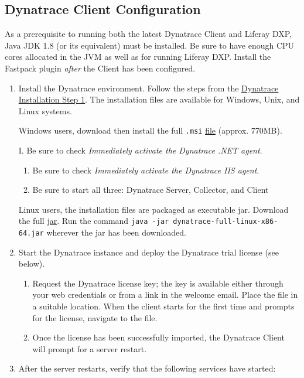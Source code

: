 \subsection{Dynatrace Client
Configuration}\label{dynatrace-client-configuration}

As a prerequisite to running both the latest Dynatrace Client and
Liferay DXP, Java JDK 1.8 (or its equivalent) must be installed. Be sure
to have enough CPU cores allocated in the JVM as well as for running
Liferay DXP. Install the Fastpack plugin \emph{after} the Client has
been configured.

\begin{enumerate}
\def\labelenumi{\arabic{enumi}.}
\item
  Install the Dynatrace environment. Follow the steps from the
  \href{https://community.compuwareapm.com/community/display/EVAL/Step+1+-+Download+and+install+dynaTrace}{Dynatrace
  Installation Step 1}. The installation files are available for
  Windows, Unix, and Linux systems.

  Windows users, download then install the full \texttt{.msi}
  \href{https://files.dynatrace.com/downloads/appmon/freetrial/dynatrace-full-x86-64.msi}{file}
  (approx. 770MB).

  I. Be sure to check \emph{Immediately activate the Dynatrace .NET
  agent}.

  \begin{enumerate}
  \def\labelenumii{\Roman{enumii}.}
  \setcounter{enumii}{1}
  \tightlist
  \item
    Be sure to check \emph{Immediately activate the Dynatrace IIS
    agent}.
  \item
    Be sure to start all three: Dynatrace Server, Collector, and Client
  \end{enumerate}

  Linux users, the installation files are packaged as executable jar.
  Download the full
  \href{https://files.dynatrace.com/downloads/appmon/freetrial/dynatrace-full-linux-x86-64.jar}{jar}.
  Run the command \texttt{java\ -jar\ dynatrace-full-linux-x86-64.jar}
  wherever the jar has been downloaded.
\item
  Start the Dynatrace instance and deploy the Dynatrace trial license
  (see below).

  \begin{enumerate}
  \def\labelenumii{\alph{enumii}.}
  \item
    Request the Dynatrace license key; the key is available either
    through your web credentials or from a link in the welcome email.
    Place the file in a suitable location. When the client starts for
    the first time and prompts for the license, navigate to the file.
  \item
    Once the license has been successfully imported, the Dynatrace
    Client will prompt for a server restart.
  \end{enumerate}
\item
  After the server restarts, verify that the following services have
  started:


\end{enumerate}
